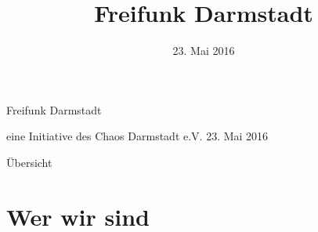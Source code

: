 \documentclass[10pt]{beamer}
\title{Freifunk Darmstadt}
\author{}
\institute[Inst.]{eine Initiative des Chaos Darmstadt e.V.}
\date{\footnotesize 23. Mai 2016}
\begin{document}
{
  \begin{frame}
    \begin{huge}
      Freifunk Darmstadt
    \end{huge}
    \vspace{0.25em}
    \newline
    eine Initiative des Chaos Darmstadt e.V.
    \newline
    \vspace{0.5em}
    \newline
    \small{23. Mai 2016}
    \vfill
  \end{frame}
}
  \begin{frame}{Übersicht}
    \tableofcontents
  \end{frame}

  \section{Wer wir sind}
\end{document}
